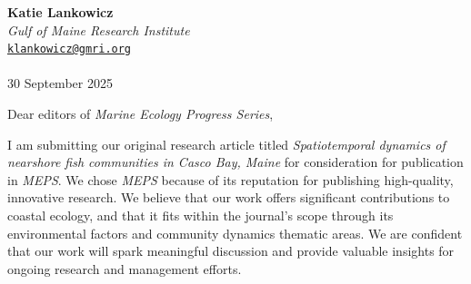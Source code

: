 \documentclass[
  11pt,
]{article}
\author{Katie Lankowicz}
\date{}
\begin{document}
\hfill
\begin{minipage}[t]{1\textwidth}
\raggedleft
{\bfseries Katie Lankowicz }\\[.1ex]
	\hspace{1 mm}	\emph{\small Gulf of Maine Research Institute} \\[.1ex]
\faEnvelopeO	\hspace{1 mm} \small{\tt \href{mailto: klankowczi@gmri.org}{\nolinkurl{klankowicz@gmri.org}}} \\
\hspace{1 mm} \\
30 September 2025 \\ 
\end{minipage}

\vspace*{0.5em}

Dear editors of \textit{Marine Ecology Progress Series},

\vspace*{0.5em}

I am submitting our original research article titled \textit{Spatiotemporal dynamics of nearshore fish communities in Casco Bay, Maine} for consideration for publication in \textit{MEPS}. We chose \textit{MEPS} because of its reputation for publishing high-quality, innovative research. We believe that our work offers significant contributions to coastal ecology, and that it fits within the journal's scope through its environmental factors and community dynamics thematic areas. We are confident that our work will spark meaningful discussion and provide valuable insights for ongoing research and management efforts.
\end{document}
